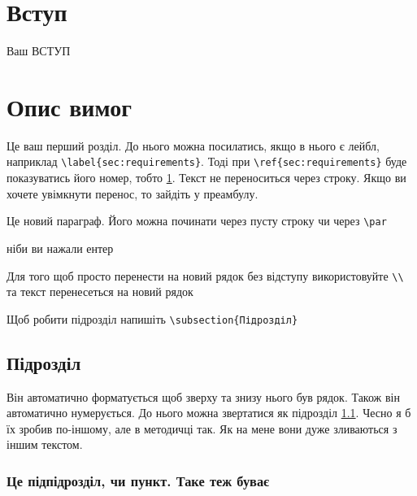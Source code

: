 \documentclass[a4paper, 14pt]{article}
\begin{document}
\section*{Вступ}
Ваш ВСТУП

\section{Опис вимог}
\label{sec:requirements} %
Це ваш перший розділ. До нього можна посилатись, якщо в нього є лейбл, наприклад \verb|\label{sec:requirements}|. Тоді при \verb|\ref{sec:requirements}| буде показуватись його номер, тобто \ref{sec:requirements}. Текст не переноситься через строку. Якщо ви хочете увімкнути перенос, то зайдіть у преамбулу.

Це новий параграф. Його можна починати через пусту строку чи через \verb|\par| \par
ніби ви нажали ентер

Для того щоб просто перенести на новий рядок без відступу використовуйте \verb|\\| \\
та текст перенесеться на новий рядок

Щоб робити підрозділ напишіть \verb|\subsection{Підрозділ}| 

\subsection{Підрозділ}
\label{sec:subsection} %
Він автоматично форматується щоб зверху та знизу нього був рядок. Також він автоматично нумерується. До нього можна звертатися як підрозділ \ref{sec:subsection}. Чесно я б їх зробив по-іншому, але в методичці так. Як на мене вони дуже зливаються з іншим текстом.

\subsubsection{Це підпідрозділ, чи пункт. Таке теж буває}
\end{document}

